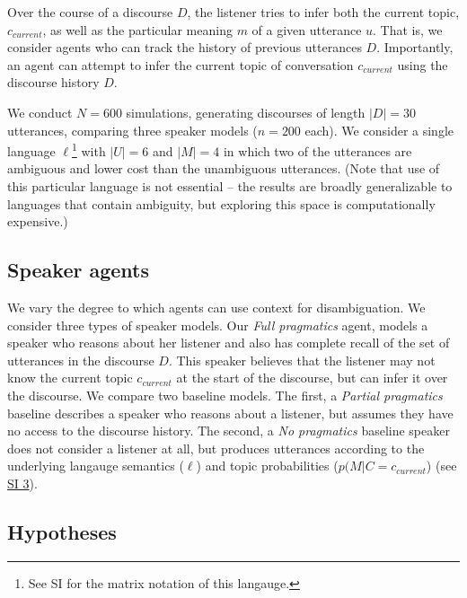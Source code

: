 \documentclass[10pt, letterpaper]{article}
\begin{document}
Over the course of a discourse \(D\), the listener tries to infer both
the current topic, \(c_{current}\), as well as the particular meaning
\(m\) of a given utterance \(u\). That is, we consider agents who can
track the history of previous utterances \(D\). Importantly, an agent
can attempt to infer the current topic of conversation \(c_{current}\)
using the discourse history \(D\).\par

We conduct \(N=600\) simulations, generating discourses of length
\(|D|=30\) utterances, comparing three speaker models (\(n=200\) each).
We consider a single language
\(\ell\)\footnote{See SI for the matrix notation of this langauge.} with
\(|U|=6\) and \(|M|=4\) in which two of the utterances are ambiguous and
lower cost than the unambiguous utterances. (Note that use of this
particular language is not essential -- the results are broadly
generalizable to languages that contain ambiguity, but exploring this
space is computationally expensive.)\par

\subsection{Speaker agents}\label{speaker-agents}

We vary the degree to which agents can use context for disambiguation.
We consider three types of speaker models. Our \textit{Full pragmatics}
agent, models a speaker who reasons about her listener and also has
complete recall of the set of utterances in the discourse \(D\). This
speaker believes that the listener may not know the current topic
\(c_{current}\) at the start of the discourse, but can infer it over the
discourse. We compare two baseline models. The first, a
\textit{Partial pragmatics} baseline describes a speaker who reasons
about a listener, but assumes they have no access to the discourse
history. The second, a \textit{No pragmatics} baseline speaker does not
consider a listener at all, but produces utterances according to the
underlying langauge semantics (\(\ell\)) and topic probabilities
(\(p(M|C=c_{current}\)) (see
\href{https://github.com/benpeloquin7/zipf_principles/blob/master/paper/supplementary_materials.pdf}{SI 3}).\par

\subsection{Hypotheses}\label{hypotheses}
\end{document}
